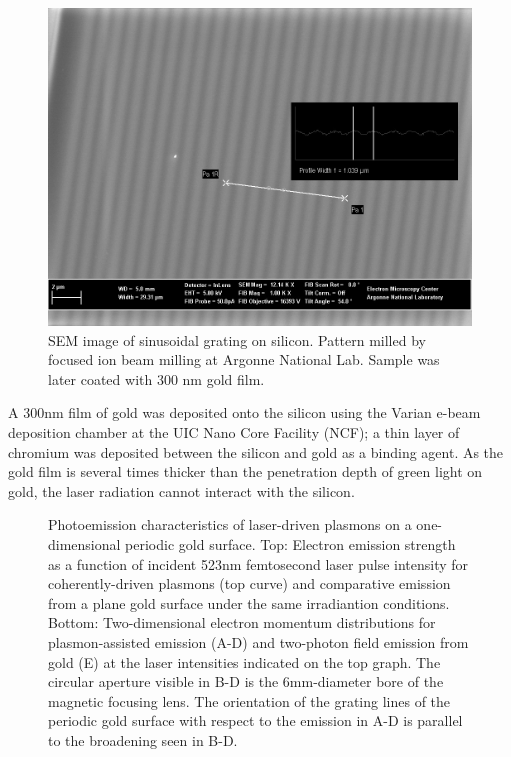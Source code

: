 \begin{figure}
  \centering
  \includegraphics{HighMagSEM.jpg}
  \caption[SEM image of sinusoidal grating on silicon]{
    SEM image of sinusoidal grating on silicon.
    Pattern milled by focused ion beam milling at Argonne National Lab.
    Sample was later coated with 300 nm gold film.
  }
  \label{fig:fib-si-sem}
\end{figure}

A 300nm film of gold was deposited onto the silicon using the Varian e-beam deposition chamber at the UIC Nano Core Facility (NCF); a thin layer of chromium was deposited between the silicon and gold as a binding agent.
As the gold film is several times thicker than the penetration depth of green light on gold, the laser radiation cannot interact with the silicon.

\begin{figure}
  \centering
  
  \caption[Photoemission characteristics of laser-driven plasmons on a one-dimensional periodic gold surface]{
    Photoemission characteristics of laser-driven plasmons on a one-dimensional periodic gold surface.
    Top: Electron emission strength as a function of incident 523nm femtosecond laser pulse intensity for coherently-driven plasmons (top curve)
      and comparative emission from a plane gold surface under the same irradiantion conditions.
    Bottom: Two-dimensional electron momentum distributions for plasmon-assisted emission (A-D) and two-photon field emission from gold (E) at the laser intensities indicated on the top graph.
    The circular aperture visible in B-D is the 6mm-diameter bore of the magnetic focusing lens.
    The orientation of the grating lines of the periodic gold surface with respect to the emission in A-D is parallel to the broadening seen in B-D.
  }
  \label{fig:pape}
\end{figure}

